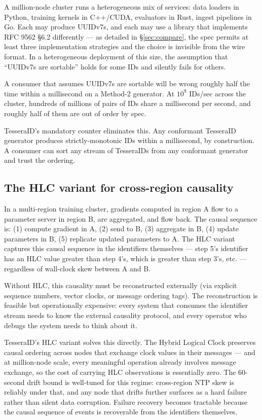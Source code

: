 A million-node cluster runs a heterogeneous mix of services: data loaders in Python, training kernels in C++/CUDA, evaluators in Rust, ingest pipelines in Go. Each may produce UUIDv7s, and each may use a library that implements RFC 9562 §6.2 differently --- as detailed in §\ref{sec:compare}, the spec permits at least three implementation strategies and the choice is invisible from the wire format. In a heterogeneous deployment of this size, the assumption that ``UUIDv7s are sortable'' holds for some IDs and silently fails for others.

A consumer that assumes UUIDv7s are sortable will be wrong roughly half the time within a millisecond on a Method-2 generator. At $10^9$ IDs/sec across the cluster, hundreds of millions of pairs of IDs share a millisecond per second, and roughly half of them are out of order by spec.

TesseraID's mandatory counter eliminates this. Any conformant TesseraID generator produces strictly-monotonic IDs within a millisecond, by construction. A consumer can sort any stream of TesseraIDs from any conformant generator and trust the ordering.

\subsection{The HLC variant for cross-region causality}

In a multi-region training cluster, gradients computed in region A flow to a parameter server in region B, are aggregated, and flow back. The causal sequence is: (1) compute gradient in A, (2) send to B, (3) aggregate in B, (4) update parameters in B, (5) replicate updated parameters to A. The HLC variant captures this causal sequence in the identifiers themselves --- step 5's identifier has an HLC value greater than step 4's, which is greater than step 3's, etc. --- regardless of wall-clock skew between A and B.

Without HLC, this causality must be reconstructed externally (via explicit sequence numbers, vector clocks, or message ordering tags). The reconstruction is feasible but operationally expensive: every system that consumes the identifier stream needs to know the external causality protocol, and every operator who debugs the system needs to think about it.

TesseraID's HLC variant solves this directly. The Hybrid Logical Clock \citep{kulkarni2014hlc} preserves causal ordering across nodes that exchange clock values in their messages --- and at million-node scale, every meaningful operation already involves message exchange, so the cost of carrying HLC observations is essentially zero. The 60-second drift bound is well-tuned for this regime: cross-region NTP skew is reliably under that, and any node that drifts further surfaces as a hard failure rather than silent data corruption. Failure recovery becomes tractable because the causal sequence of events is recoverable from the identifiers themselves.


